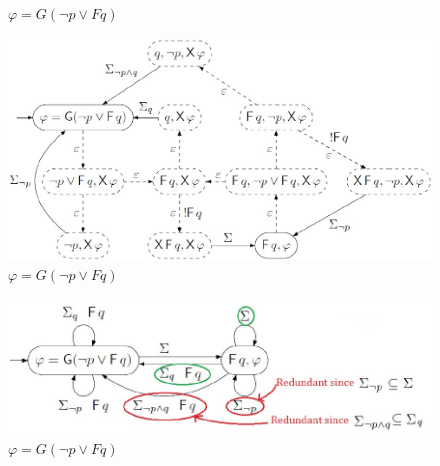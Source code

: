 \documentclass[10pt,a4paper,twocolumn]{report}
\begin{document}
\begin{itemize}
\begin{figure}[ht]
	\caption{$\varphi = G(\neg p \lor Fq)$}
	\label{ltl2gba1}
	\end{figure}
	\begin{figure}[ht]
	\includegraphics[scale=0.35]{ltl2gba_ex2.png}
	\caption{$\varphi = G(\neg p \lor Fq)$}
	\label{ltl2gba2}
	\end{figure}
	\begin{figure}[ht]
	\includegraphics[scale=0.35]{ltl2gba_ex3.png}
	\caption{$\varphi = G(\neg p \lor Fq)$}
	\label{ltl2gba3}
	\end{figure}
\end{itemize}
\end{document}
